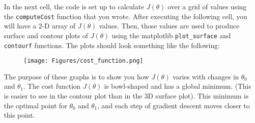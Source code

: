 \documentclass[11pt]{article}
\makeatletter
\def\maxwidth{\ifdim\Gin@nat@width>\linewidth\linewidth
    \else\Gin@nat@width\fi}
\let\Oldincludegraphics\includegraphics
\renewcommand{\includegraphics}[1]{\Oldincludegraphics[width=.8\maxwidth]{#1}}
\makeatother
\begin{document}
In the next cell, the code is set up to calculate \(J(\theta)\) over a
grid of values using the \texttt{computeCost} function that you wrote.
After executing the following cell, you will have a 2-D array of
\(J(\theta)\) values. Then, those values are used to produce surface and
contour plots of \(J(\theta)\) using the matplotlib
\texttt{plot\_surface} and \texttt{contourf} functions. The plots should
look something like the following:

\begin{figure}
\centering
\texttt{[image: Figures/cost\_function.png]}
\caption{}
\end{figure}

The purpose of these graphs is to show you how \(J(\theta)\) varies with
changes in \(\theta_0\) and \(\theta_1\). The cost function
\(J(\theta)\) is bowl-shaped and has a global minimum. (This is easier
to see in the contour plot than in the 3D surface plot). This minimum is
the optimal point for \(\theta_0\) and \(\theta_1\), and each step of
gradient descent moves closer to this point.
\end{document}
